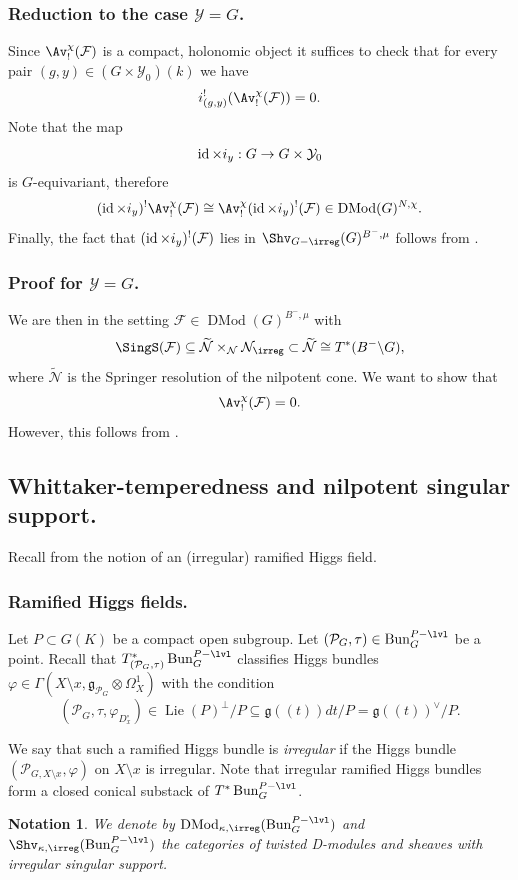 \documentclass[9pt]{amsart}
\newcommand{\cF}{{\mathcal F}}
\newcommand{\cN}{{\mathcal N}}
\newcommand{\cP}{{\mathcal P}}
\newcommand{\cY}{{\mathcal Y}}
\DeclareMathOperator{\Lie}{{Lie}}
\newtheorem{ntn}[subsubsection]{Notation}
\numberwithin{equation}{section}
\DeclareMathOperator{\D}{{DMod}}
\begin{document}
\subsubsection{Reduction to the case $\cY = G $.} Since $\Av_!^{\chi}(\cF)$ is a compact, holonomic object it suffices to check that for every pair $(g, y) \in (G \times \cY_0)(k)$ we have 
$$i_{(g, y)}^!(\Av_!^{\chi}(\cF)) =0.$$
Note that the map $$ \id\times i_y: G \rightarrow G \times \cY_0$$
is $G$-equivariant, therefore
$$(\id\times i_y)^!\Av_!^{\chi} (\cF) \cong \Av_!^{\chi}(\id\times i_y)^!(\cF) \in \D(G)^{N, \chi}.$$
Finally, the fact that $(\id\times i_y)^!(\cF) $ lies in $\Shv_{ G-\irreg}(G)^{B^-, \mu}$ follows from \cite[Proposition 3.3.4.2]{FR}.

\subsubsection{Proof for $\cY = G$.} We are then in the setting $\cF \in \D( G)^{B^-, \mu }$ with $$\SingS(\cF) \subseteq \widetilde{\cN} \times_{\cN} \cN_{\irreg} \subset \widetilde{\cN} \cong T^*(B^- \backslash G),$$ where $\widetilde{\cN}$ is the Springer resolution of the nilpotent cone.  We want to show that 
$$\Av_!^{\chi}(\cF) =0.$$
However, this follows from \cite[Theorem 3.2.4.1]{FR}.


\subsection{Whittaker-temperedness and nilpotent singular support.}\label{temp and nilp}

Recall from \cite[4.4]{FR} the notion of an (irregular) ramified Higgs field. 
\subsubsection{Ramified Higgs fields.} Let $P \subset G(K)$ be a compact open subgroup. Let $(\cP_G, \tau) \in \Bun_G^{P-\lvl}$ be a point. Recall that $T^*_{(\cP_G, \tau)}\Bun_G^{P-\lvl}$ classifies Higgs bundles $\varphi \in \Gamma(X \setminus x, \mathfrak{g}_{\cP_G} \otimes \Omega_X^1)$ with the condition
$$(\cP_G, \tau, \varphi_{D_x^{\circ}}) \in \Lie(P)^{\perp}/P \subseteq \mathfrak{g}((t))dt / P = \mathfrak{g}((t))^{\vee} / P .$$

We say that such a ramified Higgs bundle is \emph{irregular }if the Higgs bundle $(\cP_{G, X \setminus x}, \varphi)$ on $X \setminus x$ is irregular. Note that irregular ramified Higgs bundles form a closed conical substack of $T^*\Bun_G^{P-\lvl}$.
\begin{ntn}
	We denote by $\D_{\kappa, \irreg}(\Bun_G^{P -\lvl})$ and $\Shv_{\kappa, \irreg}(\Bun_G^{P -\lvl})$ the categories of twisted D-modules and sheaves with irregular singular support.
\end{ntn}
\end{document}
